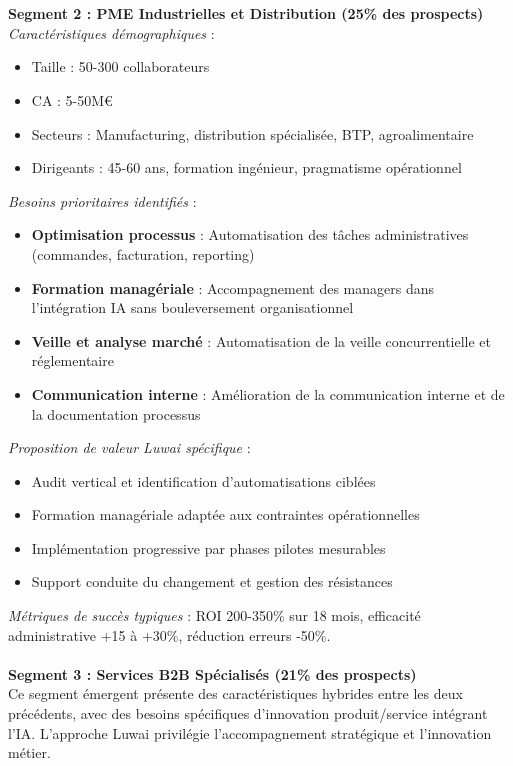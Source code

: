 \\\\
\textbf{Segment 2 : PME Industrielles et Distribution (25\% des prospects)}\\
\emph{Caractéristiques démographiques} :
\begin{itemize}
    \item Taille : 50-300 collaborateurs
    \item CA : 5-50M€
    \item Secteurs : Manufacturing, distribution spécialisée, BTP, agroalimentaire
    \item Dirigeants : 45-60 ans, formation ingénieur, pragmatisme opérationnel
\end{itemize}
\medskip
\emph{Besoins prioritaires identifiés} :
\begin{itemize}
    \item \textbf{Optimisation processus} : Automatisation des tâches administratives (commandes, facturation, reporting)
    \item \textbf{Formation managériale} : Accompagnement des managers dans l'intégration IA sans bouleversement organisationnel
    \item \textbf{Veille et analyse marché} : Automatisation de la veille concurrentielle et réglementaire
    \item \textbf{Communication interne} : Amélioration de la communication interne et de la documentation processus
\end{itemize}
\medskip
\emph{Proposition de valeur Luwai spécifique} :
\begin{itemize}
    \item Audit vertical et identification d'automatisations ciblées
    \item Formation managériale adaptée aux contraintes opérationnelles
    \item Implémentation progressive par phases pilotes mesurables
    \item Support conduite du changement et gestion des résistances
\end{itemize}
\medskip
\emph{Métriques de succès typiques} : ROI 200-350\% sur 18 mois, efficacité administrative +15 à +30\%, réduction erreurs -50\%.
\\\\
\textbf{Segment 3 : Services B2B Spécialisés (21\% des prospects)}\\
Ce segment émergent présente des caractéristiques hybrides entre les deux précédents, avec des besoins spécifiques d'innovation produit/service intégrant l'IA. L'approche Luwai privilégie l'accompagnement stratégique et l'innovation métier.

